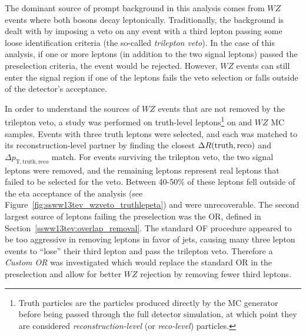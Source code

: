 The dominant source of prompt background in this analysis comes from $WZ$ events where both bosons decay leptonically.
Traditionally, the background is dealt with by imposing a veto on any event with a third lepton passing some loose identification criteria (the so-called \emph{trilepton veto}).
In the case of this analysis, if one or more leptons (in addition to the two signal leptons) passed the preselection criteria, the event would be rejected.
However, $WZ$ events can still enter the signal region if one of the leptons fails the veto selection or falls outside of the detector's acceptance.

In order to understand the sources of $WZ$ events that are not removed by the trilepton veto, a study was performed on truth-level leptons\footnote{Truth particles are the particles produced directly by the MC generator before being passed through the full detector simulation, at which point they are considered \emph{reconstruction-level} (or \emph{reco-level}) particles.} on \ssww and $WZ$ MC samples.
Events with three truth leptons were selected, and each was matched to its reconstruction-level partner by finding the closest $\Delta R(\textrm{truth},\textrm{reco})$ and $\Delta p_{\textrm{T},\textrm{truth},\textrm{reco}}$ match.
For events surviving the trilepton veto, the two signal leptons were removed, and the remaining leptons represent real leptons that failed to be selected for the veto.
Between 40-50\% of these leptons fell outside of the eta acceptance of the analysis (see Figure~\ref{fig:ssww13tev_wzveto_truthlepeta}) and were unrecoverable.
The second largest source of leptons failing the preselection was the OR, defined in Section~\ref{ssww13tev:overlap_removal}.
The standard OF procedure appeared to be too aggressive in removing leptons in favor of jets, causing many three lepton events to ``lose'' their third lepton and pass the trilepton veto.
Therefore a \emph{Custom OR} was investigated which would replace the standard OR in the preselection and allow for better $WZ$ rejection by removing fewer third leptons.


